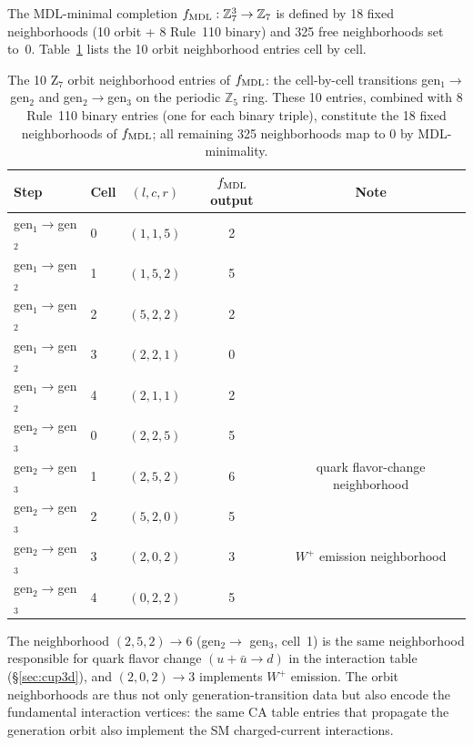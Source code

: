 \documentclass[11pt]{article}
\theoremstyle{remark}
\newcommand{\ZS}{\mathbb{Z}_7}
\begin{document}
The MDL-minimal completion $f_{\rm MDL}: \ZS^3 \to \ZS$ is defined by 18 fixed
neighborhoods (10 orbit + 8 Rule~110 binary) and 325 free neighborhoods set to~0.
Table~\ref{tab:fmdl_orbit_entries} lists the 10 orbit neighborhood entries
cell by cell.

\begin{table}[H]
\centering
\caption{The 10 Z$_7$ orbit neighborhood entries of $f_{\rm MDL}$: the cell-by-cell
transitions gen$_1\!\to$gen$_2$ and gen$_2\!\to$gen$_3$ on the periodic $\mathbb{Z}_5$ ring.
These 10 entries, combined with 8 Rule~110 binary entries (one for each binary triple),
constitute the 18 fixed neighborhoods of $f_{\rm MDL}$; all remaining 325 neighborhoods
map to 0 by MDL-minimality.}
\label{tab:fmdl_orbit_entries}
\small
\renewcommand{\arraystretch}{1.2}
\begin{tabular}{@{}llccc@{}}
\toprule
\textbf{Step} & \textbf{Cell} & \textbf{$(l,c,r)$} & \textbf{$f_{\rm MDL}$ output} & \textbf{Note}\\
\midrule
gen$_1\!\to$gen$_2$ & 0 & $(1,1,5)$ & 2 & \\
gen$_1\!\to$gen$_2$ & 1 & $(1,5,2)$ & 5 & \\
gen$_1\!\to$gen$_2$ & 2 & $(5,2,2)$ & 2 & \\
gen$_1\!\to$gen$_2$ & 3 & $(2,2,1)$ & 0 & \\
gen$_1\!\to$gen$_2$ & 4 & $(2,1,1)$ & 2 & \\
\midrule
gen$_2\!\to$gen$_3$ & 0 & $(2,2,5)$ & 5 & \\
gen$_2\!\to$gen$_3$ & 1 & $(2,5,2)$ & 6 & quark flavor-change neighborhood\\
gen$_2\!\to$gen$_3$ & 2 & $(5,2,0)$ & 5 & \\
gen$_2\!\to$gen$_3$ & 3 & $(2,0,2)$ & 3 & $W^+$ emission neighborhood\\
gen$_2\!\to$gen$_3$ & 4 & $(0,2,2)$ & 5 & \\
\bottomrule
\end{tabular}
\end{table}

The neighborhood $(2,5,2) \to 6$ (gen$_2 \to$ gen$_3$, cell~1) is the same neighborhood
responsible for quark flavor change $(u+\bar{u} \to d)$ in the interaction table
(\S\ref{sec:cup3d}), and $(2,0,2) \to 3$ implements $W^+$ emission.
The orbit neighborhoods are thus not only generation-transition data but also encode
the fundamental interaction vertices: the same CA table entries that propagate
the generation orbit also implement the SM charged-current interactions.
\end{document}
